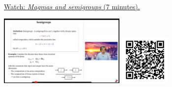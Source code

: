 
\begin{minipage}{10cm}
    \href{https://act4e-spring21.netlify.app/videos/spring2021-semi-mon-gro:mag-semi.html}{Watch: \emph{Magmas and semigroups} (7 minutes).}
        
    \href{https://act4e-spring21.netlify.app/videos/spring2021-semi-mon-gro:mag-semi.html}{\includegraphics[height=3.5cm]{spring2021-semi-mon-gro:mag-semi/thumbnails.jpg}}
    \href{https://act4e-spring21.netlify.app/videos/spring2021-semi-mon-gro:mag-semi.html}{\includegraphics[height=2.5cm]{spring2021-semi-mon-gro:mag-semi/qrcode.png}}
\end{minipage}
